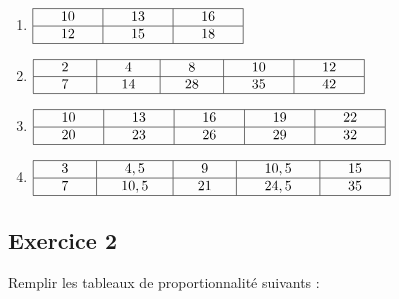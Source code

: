 \documentclass[12 pt]{extarticle}
\theoremstyle{plain}
\begin{document}
\begin{enumerate}
\item $
\begin{array}{|c|c|c|}
\hline
\phantom{000}    10    \phantom{000} 
& \phantom{000}   13    \phantom{000} & 
\phantom{000}16
\phantom{000}\\
\hline
12 &15  & 18\\
\hline
\end{array}$

\item $
\begin{array}{|c|c|c|c|c|}
\hline
\phantom{000}     2   \phantom{000} 
& \phantom{000}    4   \phantom{000} 
& \phantom{000}    8   \phantom{000} 
& \phantom{000}    10 \phantom{000} 
& \phantom{000}   12    \phantom{000}\\
\hline
 7 & 14  &28 & 35 & 42 \\
\hline
\end{array}$

\item $
\begin{array}{|c|c|c|c|c|}
\hline
\phantom{000}    10    \phantom{000} 
& \phantom{000}    13   \phantom{000} 
& \phantom{000}      16 \phantom{000} 
& \phantom{000}      19 \phantom{000} 
& 
\phantom{000}
22
\phantom{000}\\
\hline

20 & 23 & 26& 29&32 \\
\hline
\end{array}$

\item $
\begin{array}{|c|c|c|c|c|}
\hline
\phantom{000}     3   \phantom{000} 
& \phantom{000}    4,5   \phantom{000} 
& \phantom{000}     9  \phantom{000} 
& \phantom{000}      10,5 \phantom{000} 
& 
\phantom{000}
15
\phantom{000}\\
\hline

 7& 10,5 &21 &24,5 & 35\\
\hline
\end{array}$
\end{enumerate}
 
\subsection*{Exercice 2}

Remplir les tableaux de proportionnalité suivants : 
\end{document}
